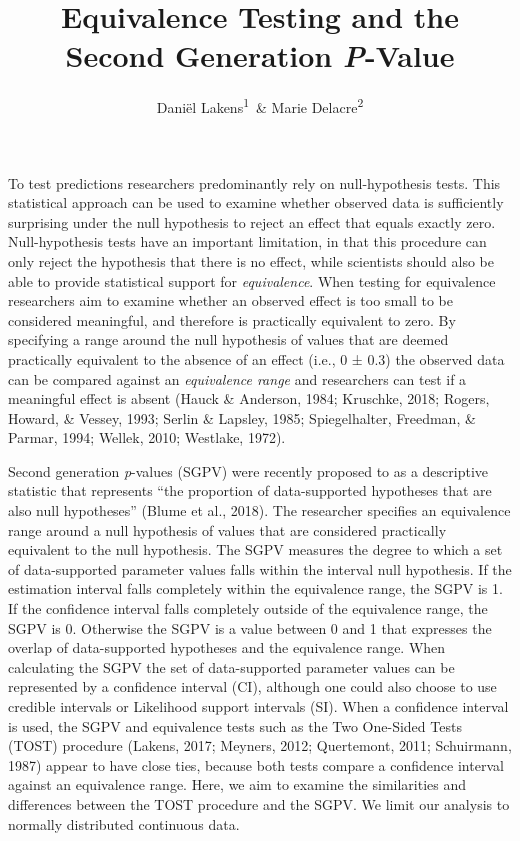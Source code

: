 \documentclass[,man,floatsintext]{apa6}
\title{Equivalence Testing and the Second Generation \emph{P}-Value}
\author{Daniël Lakens\textsuperscript{1}~\& Marie Delacre\textsuperscript{2}}
\date{}
\affiliation{
\vspace{0.5cm}
\textsuperscript{1} Eindhoven University of Technology, Eindhoven, The Netherlands\\\textsuperscript{2} Service of Analysis of the Data, Université Libre de Bruxelles, Belgium}
\begin{document}
\maketitle

To test predictions researchers predominantly rely on null-hypothesis
tests. This statistical approach can be used to examine whether observed
data is sufficiently surprising under the null hypothesis to reject an
effect that equals exactly zero. Null-hypothesis tests have an important
limitation, in that this procedure can only reject the hypothesis that
there is no effect, while scientists should also be able to provide
statistical support for \emph{equivalence}. When testing for equivalence
researchers aim to examine whether an observed effect is too small to be
considered meaningful, and therefore is practically equivalent to zero.
By specifying a range around the null hypothesis of values that are
deemed practically equivalent to the absence of an effect (i.e., 0 ±
0.3) the observed data can be compared against an \emph{equivalence
range} and researchers can test if a meaningful effect is absent (Hauck
\& Anderson, 1984; Kruschke, 2018; Rogers, Howard, \& Vessey, 1993;
Serlin \& Lapsley, 1985; Spiegelhalter, Freedman, \& Parmar, 1994;
Wellek, 2010; Westlake, 1972).

Second generation \emph{p}-values (SGPV) were recently proposed to as a
descriptive statistic that represents \enquote{the proportion of
data-supported hypotheses that are also null hypotheses} (Blume et al.,
2018). The researcher specifies an equivalence range around a null
hypothesis of values that are considered practically equivalent to the
null hypothesis. The SGPV measures the degree to which a set of
data-supported parameter values falls within the interval null
hypothesis. If the estimation interval falls completely within the
equivalence range, the SGPV is 1. If the confidence interval falls
completely outside of the equivalence range, the SGPV is 0. Otherwise
the SGPV is a value between 0 and 1 that expresses the overlap of
data-supported hypotheses and the equivalence range. When calculating
the SGPV the set of data-supported parameter values can be represented
by a confidence interval (CI), although one could also choose to use
credible intervals or Likelihood support intervals (SI). When a
confidence interval is used, the SGPV and equivalence tests such as the
Two One-Sided Tests (TOST) procedure (Lakens, 2017; Meyners, 2012;
Quertemont, 2011; Schuirmann, 1987) appear to have close ties, because
both tests compare a confidence interval against an equivalence range.
Here, we aim to examine the similarities and differences between the
TOST procedure and the SGPV. We limit our analysis to normally
distributed continuous data.
\end{document}
